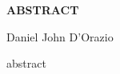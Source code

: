 \thispagestyle{empty}
\begin{center}

{\Large \bf ABSTRACT}

\vspace{.35in}
{\large \bf \thesistitle}

\vspace{.35in}

{\large Daniel John D'Orazio} \\
\vspace{.35in}
\end{center}
%
abstract